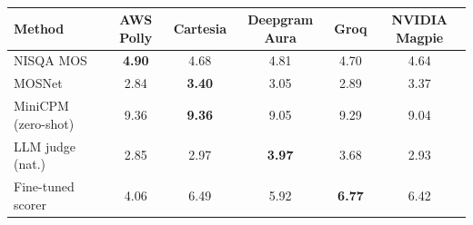 \begin{table}[t]
\centering
\caption{}
\label{tab:method-disagreement}
\begin{tabular}{lccccc}
\toprule
Method & AWS Polly & Cartesia & Deepgram Aura & Groq & NVIDIA Magpie \\
\midrule
NISQA MOS & \textbf{4.90} & 4.68 & 4.81 & 4.70 & 4.64 \\
MOSNet & 2.84 & \textbf{3.40} & 3.05 & 2.89 & 3.37 \\
MiniCPM (zero-shot) & 9.36 & \textbf{9.36} & 9.05 & 9.29 & 9.04 \\
LLM judge (nat.) & 2.85 & 2.97 & \textbf{3.97} & 3.68 & 2.93 \\
Fine-tuned scorer & 4.06 & 6.49 & 5.92 & \textbf{6.77} & 6.42 \\
\bottomrule
\end{tabular}
\end{table}